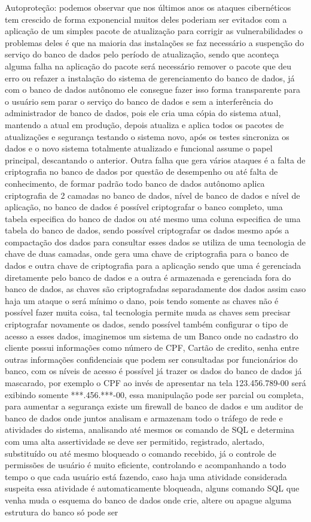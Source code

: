 	
	Autoproteção: podemos observar que nos últimos anos os ataques cibernéticos tem crescido de forma exponencial muitos deles poderiam ser evitados com a aplicação de um simples pacote de atualização para corrigir as vulnerabilidades o problemas deles é que na maioria das instalações se faz necessário a suspenção do serviço do banco de dados pelo período de atualização, sendo que aconteça alguma falha na aplicação do pacote será necessário remover o pacote que deu erro ou refazer a instalação do sistema de gerenciamento do banco de dados, já com o banco de dados autônomo ele consegue fazer isso forma transparente para o usuário sem parar o serviço do banco de dados e sem a interferência do administrador de banco de dados, pois ele cria uma cópia do sistema atual, mantendo a atual em produção, depois atualiza e aplica todos os pacotes de atualizações e segurança testando o sistema novo, após os testes sincroniza os dados e o novo sistema totalmente atualizado e funcional assume o papel principal, descantando o anterior. Outra falha que gera vários ataques é a falta de criptografia no banco de dados por questão de desempenho ou até falta de conhecimento, de formar padrão todo banco de dados autônomo aplica criptografia de 2 camadas no banco de dados, nível de banco de dados e nível de aplicação, no banco de dados é possível criptografar o banco completo, uma tabela especifica do banco de dados ou até mesmo uma coluna especifica de uma tabela do banco de dados, sendo possível criptografar os dados mesmo após a compactação dos dados para consultar esses dados se utiliza de uma tecnologia de chave de duas camadas, onde gera uma chave de criptografia para o banco de dados e outra chave de criptografia para a aplicação sendo que uma é gerenciada diretamente pelo banco de dados e a outra é armazenada e gerenciada fora do banco de dados, as chaves são criptografadas separadamente dos dados assim caso haja um ataque o será mínimo o dano, pois tendo somente as chaves não é possível fazer muita coisa, tal tecnologia permite muda as chaves sem precisar criptografar novamente os dados, sendo possível também configurar o tipo de acesso a esses dados, imaginemos um sistema de um Banco onde no cadastro do cliente possui informações como número de CPF, Cartão de credito, senha entre outras informações confidenciais que podem ser consultadas por funcionários do banco, com os níveis de acesso é possível já trazer os dados do banco de dados já mascarado, por exemplo o CPF ao invés de apresentar na tela 123.456.789-00 será exibindo somente ***.456.***-00, essa manipulação pode ser parcial ou completa, para aumentar a segurança existe um firewall de banco de dados  e um auditor de banco de dados onde juntos analisam e armazenam todo o tráfego de rede e atividades do sistema, analisando até mesmos os comando de SQL e determina com uma alta assertividade se deve ser permitido, registrado, alertado, substituído ou até mesmo bloqueado o comando recebido, já o controle de permissões de usuário é muito eficiente, controlando e acompanhando a todo tempo o que cada usuário está fazendo, caso haja uma atividade considerada suspeita essa atividade é automaticamente bloqueada, alguns comando SQL que venha muda o esquema do banco de dados onde crie, altere ou apague alguma estrutura do banco só pode ser 